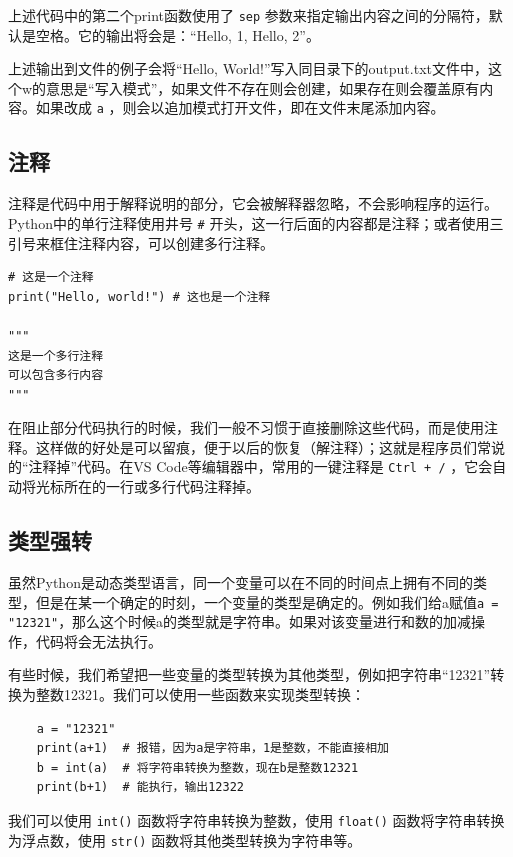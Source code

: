 上述代码中的第二个print函数使用了 \texttt{sep} 参数来指定输出内容之间的分隔符，默认是空格。它的输出将会是：“Hello,
1, Hello, 2”。

上述输出到文件的例子会将“Hello,
World!”写入同目录下的output.txt文件中，这个w的意思是“写入模式”，如果文件不存在则会创建，如果存在则会覆盖原有内容。如果改成 \texttt{a} ，则会以追加模式打开文件，即在文件末尾添加内容。

\subsection{注释}

注释是代码中用于解释说明的部分，它会被解释器忽略，不会影响程序的运行。Python中的单行注释使用井号 \texttt{\#} 开头，这一行后面的内容都是注释；或者使用三引号来框住注释内容，可以创建多行注释。
\begin{verbatim}
# 这是一个注释
print("Hello, world!") # 这也是一个注释

"""
这是一个多行注释
可以包含多行内容
"""
\end{verbatim}

在阻止部分代码执行的时候，我们一般不习惯于直接删除这些代码，而是使用注释。这样做的好处是可以留痕，便于以后的恢复（解注释）；这就是程序员们常说的“注释掉”代码。在VS
Code等编辑器中，常用的一键注释是 \texttt{Ctrl + /} ，它会自动将光标所在的一行或多行代码注释掉。

\subsection{类型强转}

虽然Python是动态类型语言，同一个变量可以在不同的时间点上拥有不同的类型，但是在某一个确定的时刻，一个变量的类型是确定的。例如我们给a赋值\texttt{a
= "12321"}，那么这个时候a的类型就是字符串。如果对该变量进行和数的加减操作，代码将会无法执行。

有些时候，我们希望把一些变量的类型转换为其他类型，例如把字符串“12321”转换为整数12321。我们可以使用一些函数来实现类型转换：

\begin{verbatim}
    a = "12321"
    print(a+1)  # 报错，因为a是字符串，1是整数，不能直接相加
    b = int(a)  # 将字符串转换为整数，现在b是整数12321
    print(b+1)  # 能执行，输出12322
\end{verbatim}

我们可以使用 \texttt{int()} 函数将字符串转换为整数，使用 \texttt{float()} 函数将字符串转换为浮点数，使用 \texttt{str()} 函数将其他类型转换为字符串等。

